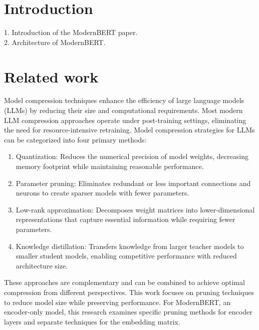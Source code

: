 \documentclass[twocolumn]{article}
\begin{document}


\section{Introduction}
1. Introduction of the ModernBERT paper. \\
2. Architecture of ModernBERT.

\section{Related work}
Model compression techniques enhance the efficiency of large language models (LLMs) by reducing their size and computational requirements. Most modern LLM compression approaches operate under post-training settings, eliminating the need for resource-intensive retraining. Model compression strategies for LLMs can be categorized into four primary methods:

\begin{enumerate}
    \item Quantization: Reduces the numerical precision of model weights, decreasing memory footprint while maintaining reasonable performance.
    
    \item Parameter pruning: Eliminates redundant or less important connections and neurons to create sparser models with fewer parameters.
    
    \item Low-rank approximation: Decomposes weight matrices into lower-dimensional representations that capture essential information while requiring fewer parameters.
    
    \item Knowledge distillation: Transfers knowledge from larger teacher models to smaller student models, enabling competitive performance with reduced architecture size.
\end{enumerate}

These approaches are complementary and can be combined to achieve optimal compression from different perspectives. 
This work focuses on pruning techniques to reduce model size while preserving performance.
For ModernBERT, an encoder-only model, this research examines specific pruning methods for encoder layers and separate techniques for the embedding matrix.
\end{document}
